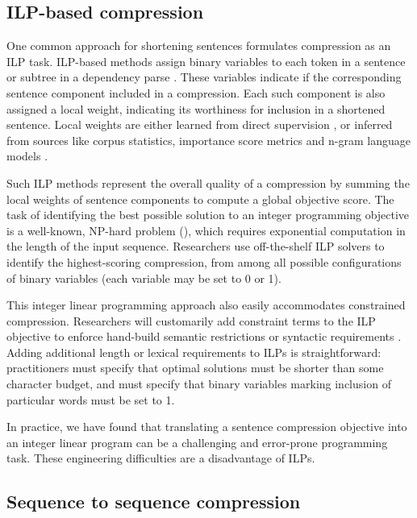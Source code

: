 \documentclass[11pt,a4paper]{article}
\begin{document}
\subsection{ILP-based compression}\label{s:ilps}

One common approach for shortening sentences formulates compression as an ILP task. ILP-based methods assign binary variables to each token in a sentence \cite{clarke2008global} or subtree in a dependency parse \cite{filippova2008dependency}. These variables indicate if the corresponding sentence component included in a compression. Each such component is also assigned a local weight, indicating its worthiness for inclusion in a shortened sentence. Local weights are either learned from direct supervision \cite{filippova2013overcoming,Wang2017CanSH}, or inferred from sources like corpus statistics, importance score metrics and n-gram language models \cite{clarke2008global,filippova2008dependency}.

Such ILP methods represent the overall quality of a compression by summing the local weights of sentence components to compute a global objective score.  The task of identifying the best possible solution to an integer programming objective is a well-known, NP-hard problem (\cite{clarke2008global}), which requires exponential computation in the length of the input sequence. Researchers use off-the-shelf ILP solvers to identify the highest-scoring compression, from among all possible configurations of binary variables (each variable may be set to 0 or 1).

This integer linear programming approach also easily accommodates constrained compression. Researchers will customarily add constraint terms to the ILP objective to enforce hand-build semantic restrictions \cite{clarke2008global} or syntactic requirements \cite{filippova2008dependency}. Adding additional length or lexical requirements to ILPs is straightforward: practitioners must specify that optimal solutions must be shorter than some character budget, and must specify that binary variables marking inclusion of particular words must be set to 1. 

In practice, we have found that translating a sentence compression objective into an integer linear program can be a challenging and error-prone programming task. These engineering difficulties are a disadvantage of ILPs.

\subsection{Sequence to sequence compression}
\end{document}
